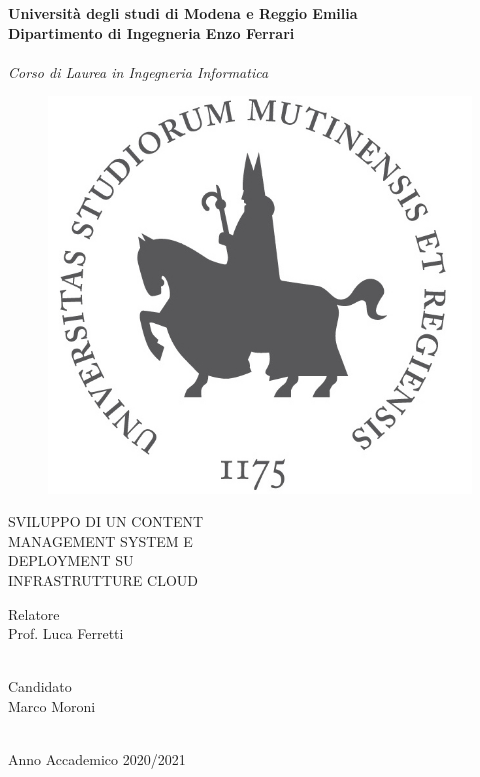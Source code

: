 \documentclass[12pt,a4paper]{article}
\begin{document}
\begin{titlepage}
    \begin{center}
    {

        \large
        \textbf{Università  degli studi di Modena e Reggio Emilia} \\
        \textbf{Dipartimento di Ingegneria Enzo Ferrari} \\
        \hspace*{0cm} \hrulefill \hspace*{0cm} \\
        \emph{Corso di Laurea in Ingegneria Informatica}
        \vspace{5mm}
        \begin{figure}[H]
            \centering
            \includegraphics[width=.3\linewidth]{logo_unimore.jpg}
        \end{figure}
        \vspace{10mm}
        \huge{\uppercase{
        Sviluppo di un Content\\
        Management System e\\
        Deployment su\\
        Infrastrutture Cloud\\}}}
        \vspace{5mm}


    \end{center}
    \vspace{25mm}
    \par
    \noindent
    \begin{minipage}[t]{0.47\textwidth}
        {\large{ Relatore\\
        Prof.
        Luca Ferretti}}\\
        \\
    \end{minipage}
    \hfill
    \begin{minipage}[t]{0.47\textwidth}\raggedleft
        {\large{ Candidato\\
        Marco Moroni}}
    \end{minipage}
    \vspace{20mm}
    \begin{center}
        \hspace*{0cm} \hrulefill \hspace*{0cm} \\
        {\large{
        Anno Accademico 2020/2021}}
    \end{center}

\end{titlepage}
\end{document}
